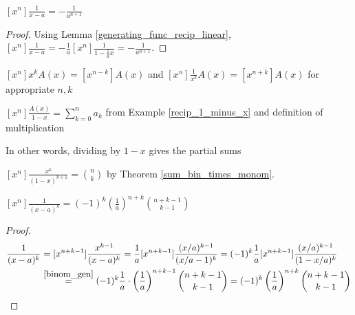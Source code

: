 \documentclass[a4paper]{article}
\begin{document}
\begin{lemma}\label{easier_gen_linear}
$\displaystyle[x^n]\frac1{x-a}=-\frac1{a^{n+1}}$

\begin{hl}
\begin{proof}
Using Lemma \ref{generating_func_recip_linear}, $\displaystyle [x^n]\frac1{x-a}=-\frac1a[x^n]\frac1{1-\frac1ax}=-\frac1{a^{n+1}}$.
\end{proof}
\end{hl}
\end{lemma}

\begin{example}
$[x^n]x^kA(x)=[x^{n-k}]A(x)$ and $\displaystyle[x^n]\frac1{x^k}A(x)=[x^{n+k}]A(x)$ for appropriate $n,k$
\end{example}

\begin{lemma}\label{part_sums_gen}
$\displaystyle[x^n]\frac{A(x)}{1-x}=\sum_{k=0}^na_k$ from Example \ref{recip_1_minus_x} and definition of multiplication
\begin{arrows}
\item In other words, dividing by $1-x$ gives the partial sums
\end{arrows}
\end{lemma}
%
%

\begin{lemma}\label{binom_gen}
$\displaystyle[x^n]\frac{x^k}{(1-x)^{k+1}}=\binom nk$ by Theorem \ref{sum_bin_times_monom}.
\end{lemma}

\begin{lemma}
$\displaystyle [x^n]\frac1{(x-a)^k}=(-1)^k\left(\frac1a\right)^{n+k}\binom{n+k-1}{k-1}$

\begin{hl}
\begin{proof}
\begin{align*}
[x^n]\frac1{(x-a)^k}
&=[x^{n+k-1}]\frac{x^{k-1}}{(x-a)^k}
=\frac1a[x^{n+k-1}]\frac{(x/a)^{k-1}}{(x/a-1)^k}
=(-1)^k\frac1a[x^{n+k-1}]\frac{(x/a)^{k-1}}{(1-x/a)^k}\\
&\overset{\ref{binom_gen}}=(-1)^k\frac1a\cdot\left(\frac1a\right)^{n+k-1}\binom{n+k-1}{k-1}
=(-1)^k\left(\frac1a\right)^{n+k}\binom{n+k-1}{k-1}\qedhere
\end{align*}
\end{proof}
\end{hl}
\end{lemma}
\end{document}
